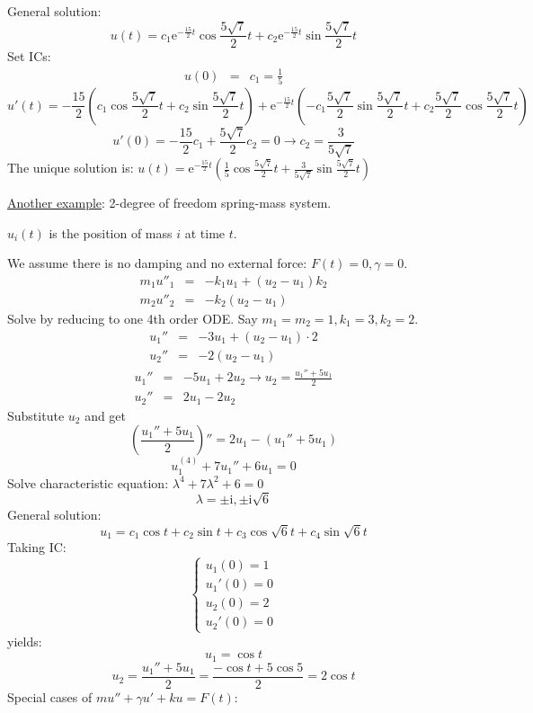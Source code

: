 \documentclass{article}
\newcommand{\mathe}{\mathrm{e}}
\newcommand{\mathi}{\mathrm{i}}
\begin{document}
General solution:
\[ u (t) = c_1 \mathe^{- \frac{15}{2} t} \cos \frac{5 \sqrt{7}}{2} t + c_2
   \mathe^{- \frac{15}{2} t} \sin \frac{5 \sqrt{7}}{2} t \]
Set ICs:
\begin{eqnarray*}
  u (0) & = & c_1 = \frac{1}{5}
\end{eqnarray*}
\[ u' (t) = - \frac{15}{2} \left( c_1 \cos \frac{5 \sqrt{7}}{2} t + c_2 \sin
   \frac{5 \sqrt{7}}{2} t \right) + \mathe^{- \frac{15}{2} t} \left( - c_1 
   \frac{5 \sqrt{7}}{2} \sin \frac{5 \sqrt{7}}{2} t + c_2  \frac{5
   \sqrt{7}}{2} \cos \frac{5 \sqrt{7}}{2} t \right) \]
\[ u' (0) = - \frac{15}{2} c_1 + \frac{5 \sqrt{7}}{2} c_2 = 0 \rightarrow c_2
   = \frac{3}{5 \sqrt{7}} \]
The unique solution is: $u (t) = \mathe^{- \frac{15}{2} t} \left( \frac{1}{5}
\cos \frac{5 \sqrt{7}}{2} t + \frac{3}{5 \sqrt{7}} \sin \frac{5 \sqrt{7}}{2} t
\right)$

{\underline{Another example}}: 2-degree of freedom spring-mass system.

\begin{center}
\end{center}

$u_i (t)$ is the position of mass $i$ at time $t$.

We assume there is no damping and no external force: $F (t) = 0, \gamma = 0$.
\begin{eqnarray*}
  m_1 u''_1 & = & - k_1 u_1 + (u_2 - u_1) k_2\\
  m_2 u''_2 & = & - k_2 (u_2 - u_1)
\end{eqnarray*}
Solve by reducing to one 4th order ODE. Say $m_1 = m_2 = 1, k_1 = 3, k_2 = 2$.
\begin{eqnarray*}
  u_1'' & = & - 3 u_1 + (u_2 - u_1) \cdot 2\\
  u_2'' & = & - 2 (u_2 - u_1)
\end{eqnarray*}
\begin{eqnarray*}
  u_1'' & = & - 5 u_1 + 2 u_2 \rightarrow u_2 = \frac{u_1'' + 5 u_1}{2}\\
  u_2'' & = & 2 u_1 - 2 u_2
\end{eqnarray*}
Substitute $u_2$ and get
\[ \left( \frac{u_1'' + 5 u_1}{2} \right)'' = 2 u_1 - (u_1'' + 5 u_1) \]
\[ u_1^{(4)} + 7 u_1'' + 6 u_1 = 0 \]
Solve characteristic equation: $\lambda^4 + 7 \lambda^2 + 6 = 0$
\[ \lambda = \pm \mathi, \pm \mathi \sqrt{6} \]
General solution:
\[ u_1 = c_1 \cos t + c_2 \sin t + c_3 \cos \sqrt{6} t + c_4 \sin \sqrt{6} t
\]
Taking IC:
\[ \left\{\begin{array}{l}
     u_1 (0) = 1\\
     u_1' (0) = 0\\
     u_2 (0) = 2\\
     u_2' (0) = 0
   \end{array}\right. \]
yields:
\[ u_1 = \cos t \]
\[ u_2 = \frac{u_1'' + 5 u_1}{2} = \frac{- \cos t + 5 \cos 5}{2} = 2 \cos t \]
Special cases of $mu'' + \gamma u' + ku = F (t)$:
\end{document}
